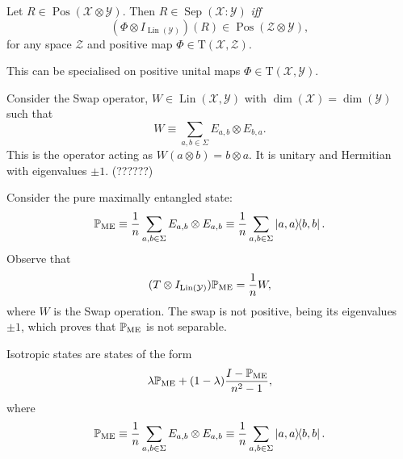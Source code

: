 \documentclass[12pt]{report}
\newcommand{\PP}{\mathbb{P}}
\newcommand{\on}[1]{\operatorname{#1}}
\newcommand{\calY}{{\mathcal{Y}}}
\newcommand{\calX}{{\mathcal{X}}}
\newcommand{\calZ}{{\mathcal{Z}}}
\newcommand{\rmT}{{\mathrm{T}}}
\DeclareMathOperator{\Pos}{Pos}
\DeclareMathOperator{\Lin}{Lin}
\begin{document}
\begin{prop}
	Let $R\in\Pos(\calX\otimes\calY)$. Then
	$R\in\on{Sep}(\calX:\calY)$ \emph{iff}
	\begin{equation}
		(\Phi\otimes I_{\Lin(\calY)})(R) \in \Pos(\calZ\otimes\calY),
	\end{equation}
	for any space $\calZ$ and positive map $\Phi\in\rmT(\calX,\calZ)$.
\end{prop}

This can be specialised on positive unital maps $\Phi\in\rmT(\calX,\calY)$. 

\begin{example}
	Consider the Swap operator, $W\in\Lin(\calX,\calY)$ with $\dim(\calX)=\dim(\calY)$ such that
	\begin{equation}
		W \equiv \sum_{a,b\in\Sigma} E_{a,b} \otimes E_{b,a}.
	\end{equation}
	This is the operator acting as $W(a\otimes b)=b\otimes a$.
	It is unitary and Hermitian with eigenvalues $\pm1$.
	(??????)
\end{example}

\begin{example}
	Consider the pure maximally entangled state:
	\begin{equation}
		\PP_{\rm ME} \equiv \frac{1}{n} \sum_{a,b\in\Sigma} E_{a,b} \otimes E_{a,b}
		\equiv \frac{1}{n} \sum_{a,b\in\Sigma} \ketbra{a,a}{b,b}.
	\end{equation}
	Observe that
	\begin{equation}
		(T\otimes I_{\Lin(\calY)}) \PP_{\rm ME} = \frac{1}{n} W,
	\end{equation}
	where $W$ is the Swap operation. The swap is not positive, being its eigenvalues $\pm1$, which proves that $\PP_{\rm ME}$ is not separable.
\end{example}

\begin{example}
	Isotropic states are states of the form
	\begin{equation}
		\lambda \PP_{\rm ME} + (1-\lambda) \frac{I - \PP_{\rm ME}}{n^2-1},
	\end{equation}
	where
	\begin{equation}
		\PP_{\rm ME} \equiv \frac{1}{n} \sum_{a,b\in\Sigma} E_{a,b} \otimes E_{a,b}
		\equiv \frac{1}{n} \sum_{a,b\in\Sigma} \ketbra{a,a}{b,b}.
	\end{equation}
\end{example}
\end{document}
